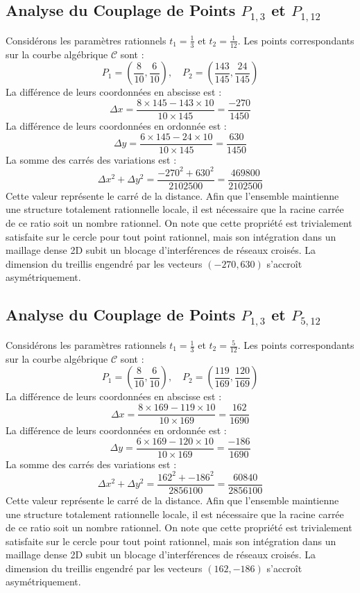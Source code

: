 \documentclass[12pt, a4paper]{article}
\begin{document}
\subsection{Analyse du Couplage de Points $P_{1,3}$ et $P_{1,12}$}
Considérons les paramètres rationnels $t_1 = \frac{1}{3}$ et $t_2 = \frac{1}{12}$.
Les points correspondants sur la courbe algébrique $\mathcal{C}$ sont :
$$ P_1 = \left( \frac{8}{10}, \frac{6}{10} \right), \quad P_2 = \left( \frac{143}{145}, \frac{24}{145} \right) $$
La différence de leurs coordonnées en abscisse est :
$$ \Delta x = \frac{8 \times 145 - 143 \times 10}{10 \times 145} = \frac{-270}{1450} $$
La différence de leurs coordonnées en ordonnée est :
$$ \Delta y = \frac{6 \times 145 - 24 \times 10}{10 \times 145} = \frac{630}{1450} $$
La somme des carrés des variations est :
$$ \Delta x^2 + \Delta y^2 = \frac{ -270^2 + 630^2 }{ 2102500 } = \frac{ 469800 }{ 2102500 } $$
Cette valeur représente le carré de la distance. Afin que l'ensemble maintienne une structure totalement rationnelle locale, il est nécessaire que la racine carrée de ce ratio soit un nombre rationnel. On note que cette propriété est trivialement satisfaite sur le cercle pour tout point rationnel, mais son intégration dans un maillage dense 2D subit un blocage d'interférences de réseaux croisés. La dimension du treillis engendré par les vecteurs $( -270, 630 )$ s'accroît asymétriquement.


\subsection{Analyse du Couplage de Points $P_{1,3}$ et $P_{5,12}$}
Considérons les paramètres rationnels $t_1 = \frac{1}{3}$ et $t_2 = \frac{5}{12}$.
Les points correspondants sur la courbe algébrique $\mathcal{C}$ sont :
$$ P_1 = \left( \frac{8}{10}, \frac{6}{10} \right), \quad P_2 = \left( \frac{119}{169}, \frac{120}{169} \right) $$
La différence de leurs coordonnées en abscisse est :
$$ \Delta x = \frac{8 \times 169 - 119 \times 10}{10 \times 169} = \frac{162}{1690} $$
La différence de leurs coordonnées en ordonnée est :
$$ \Delta y = \frac{6 \times 169 - 120 \times 10}{10 \times 169} = \frac{-186}{1690} $$
La somme des carrés des variations est :
$$ \Delta x^2 + \Delta y^2 = \frac{ 162^2 + -186^2 }{ 2856100 } = \frac{ 60840 }{ 2856100 } $$
Cette valeur représente le carré de la distance. Afin que l'ensemble maintienne une structure totalement rationnelle locale, il est nécessaire que la racine carrée de ce ratio soit un nombre rationnel. On note que cette propriété est trivialement satisfaite sur le cercle pour tout point rationnel, mais son intégration dans un maillage dense 2D subit un blocage d'interférences de réseaux croisés. La dimension du treillis engendré par les vecteurs $( 162, -186 )$ s'accroît asymétriquement.
\end{document}
